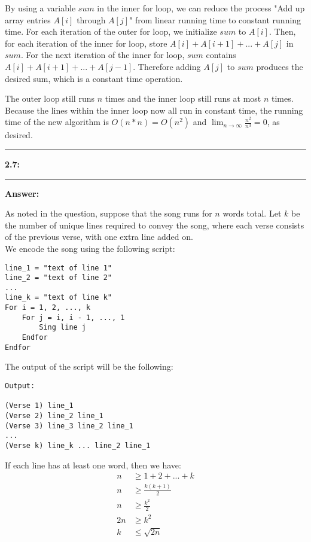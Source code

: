 \documentclass[11pt]{article}
\newcommand\question[2]{\vspace{.25in}\hrule\textbf{#1: #2}\vspace{.5em}\hrule\vspace{.10in}}
\newcommand\answer{\vspace{.10in}\textbf{Answer: }}
\begin{document}
By using a variable $sum$ in the inner for loop, we can reduce the process "Add up array entries $A[i]$ through $A[j]$" from linear running time to constant running time. 
For each iteration of the outer for loop, we initialize $sum$ to $A[i]$. Then, for each iteration of the inner for loop, store $A[i] + A[i + 1] + ... + A[j]$ in $sum$.
For the next iteration of the inner for loop, $sum$ contains $A[i] + A[i + 1] + ... + A[j - 1]$. Therefore adding $A[j]$ to $sum$ produces the desired sum, which is a constant time operation.

The outer loop still runs $n$ times and the inner loop still runs at most $n$ times. 
Because the lines within the inner loop now all run in constant time, the running time of the new algorithm is $O(n * n) = O(n^2)$ and $\lim_{n\to\infty} \frac{n^2}{n^3} = 0$, as desired.

\clearpage

\question{2.7}{}

\answer

As noted in the question, suppose that the song runs for $n$ words total. Let $k$ be the number of unique lines required to convey the song, where each verse consists of the previous verse, with one extra line added on.\\

We encode the song using the following script:\\

\begin{verbatim}
line_1 = "text of line 1"
line_2 = "text of line 2"
...
line_k = "text of line k"
For i = 1, 2, ..., k
    For j = i, i - 1, ..., 1
        Sing line j
    Endfor
Endfor
\end{verbatim}

The output of the script will be the following:\\

\begin{verbatim}
Output:

(Verse 1) line_1 
(Verse 2) line_2 line_1
(Verse 3) line_3 line_2 line_1
...
(Verse k) line_k ... line_2 line_1
\end{verbatim}

If each line has at least one word, then we have:\\

\begin{align*}
    n &\geq 1 + 2 + ... + k \\
    n &\geq \frac{k(k + 1)}{2} \\
    n &\geq \frac{k^2}{2} \\
    2n &\geq k^2 \\
    k &\leq \sqrt{2n} \\
\end{align*}
\end{document}

